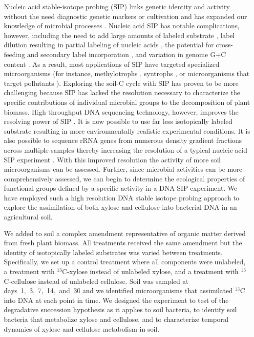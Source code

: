 Nucleic acid stable-isotope probing (SIP) links genetic identity and activity
without the need diagnostic genetic markers or cultivation and has expanded our
knowledge of microbial processes
\citep{Chen_Murrell_2010}. Nucleic acid SIP has notable complications, however,
including the need to add large amounts of labeled substrate
\citep{radajewski2000stable}, label dilution resulting in partial labeling of
nucleic acids \citep{radajewski2000stable}, the potential for cross-feeding and
secondary label incorporation \citep{DeRito2005}, and variation in genome G$+$C
content \citep{Buckley_2007}.  As a result, most applications of SIP have
targeted specialized microorganisms (for instance, methylotrophs
\citep{lueders2004b}, syntrophs \citep{lueders2004}, or microorganisms that
target pollutants \citep{derito2005}). Exploring the soil-C cycle with SIP has
proven to be more challenging because SIP has lacked the resolution necessary
to characterize the specific contributions of individual microbial groups to
the decomposition of plant biomass. High throughput DNA sequencing technology,
however, improves the resolving power of SIP \citep{Aoyagi2015}. It is now
possible to use far less isotopically labeled substrate resulting in more
environmentally realistic experimental conditions. It is also possible to
sequence rRNA genes from numerous density gradient fractions across multiple
samples thereby increasing the resolution of a typical nucleic acid SIP
experiment \citep{Verastegui_2014}. With this improved resolution the activity
of more soil microorganisms can be assessed. Further, since microbial
activities can be more comprehensively assessed, we can begin to determine the
ecological properties of functional groups defined by a specific activity in a
DNA-SIP experiment. We have employed such a high resolution DNA stable isotope
probing approach to explore the assimilation of both xylose and cellulose into
bacterial DNA in an agricultural soil. 

We added to soil a complex amendment representative of organic
matter derived from fresh plant biomass. All treatments received the same
amendment but the identity of isotopically labeled substrates was varied
between treatments. Specifically, we set up a control treatment where all
components were unlabeled, a treatment with $^{13}$C-xylose instead of
unlabeled xylose, and a treatment with $^{13}$C-cellulose instead of unlabeled
cellulose. Soil was sampled at days~1,~3,~7,~14,~and~30 and we identified
microorganisms that assimilated $^{13}$C into DNA at each point in time. We
designed the experiment to test of the degradative succession
hypothesis as it applies to soil bacteria, to identify soil bacteria that
metabolize xylose and cellulose, and to characterize temporal dynamics of
xylose and cellulose metabolism in soil. 
